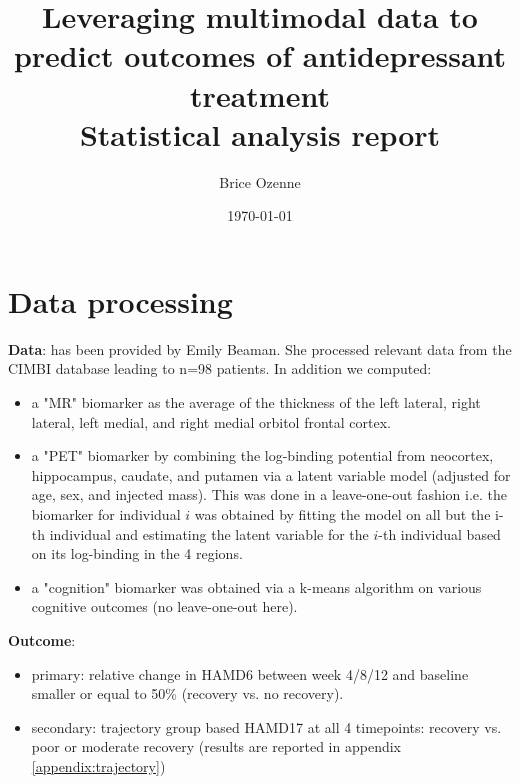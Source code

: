 \documentclass[12pt]{article}
\author{Brice Ozenne}
\date{\today}
\title{Leveraging multimodal data to predict outcomes of antidepressant treatment\\\medskip
\large Statistical analysis report}
\begin{document}
\maketitle
\section{Data processing}
\label{sec:org8f7579d}

\textbf{Data}: has been provided by Emily Beaman. She processed relevant data
from the CIMBI database leading to n=98 patients. In addition we
computed:
\begin{itemize}
\item a "MR" biomarker as the average of the thickness of the left
lateral, right lateral, left medial, and right medial orbitol
frontal cortex.
\item a "PET" biomarker by combining the log-binding potential from
neocortex, hippocampus, caudate, and putamen via a latent variable
model (adjusted for age, sex, and injected mass). This was done
in a leave-one-out fashion i.e. the biomarker for individual \(i\)
was obtained by fitting the model on all but the i-th individual and
estimating the latent variable for the \(i\)-th individual based on
its log-binding in the 4 regions.
\item a "cognition" biomarker was obtained via a k-means algorithm on
various cognitive outcomes (no leave-one-out here).
\end{itemize}

\noindent \textbf{Outcome}:
\begin{itemize}
\item primary: relative change in HAMD6 between week 4/8/12 and baseline smaller or equal to 50\% (recovery vs. no recovery).
\item secondary: trajectory group based HAMD17 at all 4 timepoints: \newline recovery vs. poor or moderate recovery \newline (results are reported in appendix \ref{appendix:trajectory})
\end{itemize}

\bigskip
\end{document}
